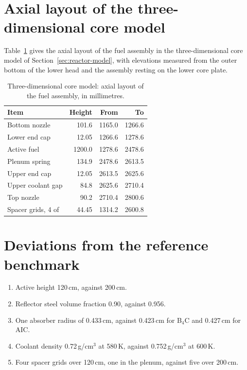 \section{Axial layout of the three-dimensional core model}
\label{app:inputs-axial}

Table~\ref{tab:axial-layout} gives the axial layout of the fuel assembly
in the three-dimensional core model of Section~\ref{sec:reactor-model},
with elevations measured from the outer bottom of the lower head and
the assembly resting on the lower core plate.

\begin{table}[htbp]
  \centering
  \caption{Three-dimensional core model: axial layout of the fuel assembly, in millimetres.}
  \label{tab:axial-layout}
  \begin{tabular}{@{}lrrr@{}}
    \toprule
    \textbf{Item} & \textbf{Height} & \textbf{From} & \textbf{To} \\
    \midrule
    Bottom nozzle             &  101.6  & 1165.0 & 1266.6 \\
    Lower end cap             &   12.05 & 1266.6 & 1278.6 \\
    Active fuel               & 1200.0  & 1278.6 & 2478.6 \\
    Plenum spring             &  134.9  & 2478.6 & 2613.5 \\
    Upper end cap             &   12.05 & 2613.5 & 2625.6 \\
    Upper coolant gap         &   84.8  & 2625.6 & 2710.4 \\
    Top nozzle                &   90.2  & 2710.4 & 2800.6 \\
    \addlinespace
    Spacer grids, 4 of        &   44.45 & 1314.2 & 2600.8 \\
    \bottomrule
  \end{tabular}
\end{table}

\section{Deviations from the reference benchmark}
\label{app:inputs-departures}

\begin{enumerate}[nosep]
  \item Active height 120\,cm, against 200\,cm.
  \item Reflector steel volume fraction 0.90, against 0.956.
  \item One absorber radius of 0.433\,cm, against 0.423\,cm for B$_4$C and 0.427\,cm for AIC.
  \item Coolant density 0.72\,g/cm$^3$ at 580\,K, against 0.752\,g/cm$^3$ at 600\,K.
  \item Four spacer grids over 120\,cm, one in the plenum, against five over 200\,cm.
\end{enumerate}
